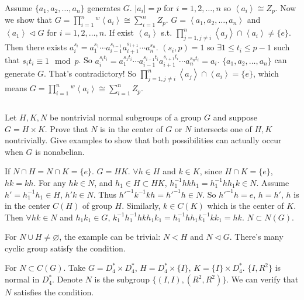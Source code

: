 \begin{answer}
    Assume $\{a_{1}, a_{2}, \dots, a_{n}\}$ generates $G$. $\left| a_{i} \right| =p$ for $i=1,2,\dots, n$  so $\left\langle a_{i}\right\rangle\cong Z_{p}$. Now we show that $G=\prod\limits_{i=1}^{n}{^{w}}\left\langle a_{i}\right\rangle\cong \sum\limits_{i=1}^{n}Z_{p}$. $G=\left\langle a_{1}, a_{2},\dots, a_{n}\right\rangle$ and $\left\langle a_{1}\right\rangle\lhd G$ for $i=1,2,\dots, n$. If exist $\left\langle a_{i}\right\rangle$ s.t. $\prod\limits_{j=1, j\neq i}^{n}\left\langle a_{j}\right\rangle\cap \left\langle a_{i}\right\rangle\neq \{e\}$. Then there exists $a_{i}^{s_{i}}=a_{1}^{s_{1}}\cdots a_{i-1}^{s_{i-1}}a_{i+1}^{s_{i+1}}\cdots a_{n}^{s_{n}}$. $(s_{i},p)=1$ so $\exists 1\leq t_{i}\leq p-1$ such that $s_{i}t_{i}\equiv 1\mod p$. So $a_{i}^{s_{i}t_{i}}=a_{1}^{s_{1}t_{i}}\cdots a_{i-1}^{s_{i-1}t_{i}}a_{i+1}^{s_{i+1}t_{i}}\cdots a_{n}^{s_{n}t_{i}}=a_{i}$. $\{a_{1}, a_{2}, \dots, a_{n}\}$ can generate $G$. That's contradictory! So $\prod\limits_{j=1, j\neq i}^{n}\left\langle a_{j}\right\rangle\cap \left\langle a_{i}\right\rangle=\{e\}$, which means $G=\prod\limits_{i=1}^{n}{^{w}}\left\langle a_{i}\right\rangle\cong \sum\limits_{i=1}^{n}Z_{p}$.
\end{answer}

$$ $$

\begin{ex}
    Let $H,K,N$ be nontrivial normal subgroups of a group $G$ and suppose $G=H\times K$. Prove that $N$ is in the center of $G$ or $N$ intersects one of $H,K$ nontrivially. Give examples to show that both possibilities can actually occur when $G$ is nonabelian.
\end{ex}

\begin{answer}
    If $N\cap H=N\cap K=\{e\}$. $G=HK$. $\forall h\in H$ and $k\in K$, since $H\cap K=\{e\}$, $hk=kh$. For any $hk\in N$, and $h_{1}\in H\subset HK$, $h_{1}^{-1}hkh_{1}=h_{1}^{-1}hh_{1}k\in N$. Assume $h'=h_{1}^{-1}h_{1}\in H$, $h'k\in N$. Thus $h'^{-1}k^{-1}kh=h'^{-1}h\in N$. So $h'^{-1}h=e$, $h=h'$, $h$ is in the center $C(H)$ of group $H$. Similarly, $k\in C(K)$ which is the center of $K$. Then $\forall hk\in N$ and $h_{1}k_{1}\in G$, $k_{1}^{-1}h_{1}^{-1}hkh_{1}k_{1}=h_{1}^{-1}hh_{1}k_{1}^{-1}kk_{1}=hk$. $N\subset N(G)$.

    For $N\cup H\neq \varnothing$, the example can be trivial: $N<H$ and $N\lhd G$. There's many cyclic group satisfy the condition.

    For $N\subset C(G)$. Take $G=D_{4}^{*}\times D_{4}^{*}$, $H=D_{4}^{*}\times \{I\}$, $K=\{I\}\times D_{4}^{*}$. $\{I,R^{2}\}$ is normal in $D_{4}^{*}$. Denote $N$ is the subgroup $\{(I,I), (R^{2},R^{2})\}$. We can verify that $N$ satisfies the condition.
\end{answer}

